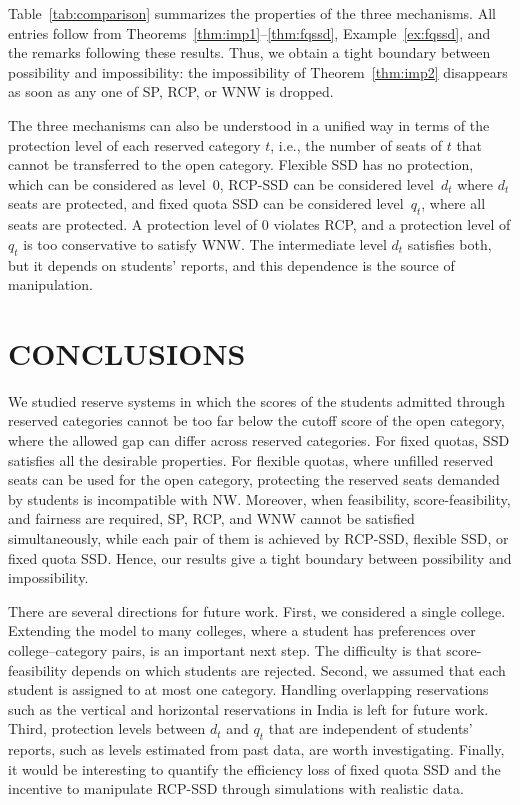 \documentclass[a4paper,twoside]{article}
\theoremstyle{definition}
\begin{document}
Table~\ref{tab:comparison} summarizes the properties of the three mechanisms.
All entries follow from Theorems~\ref{thm:imp1}--\ref{thm:fqssd}, Example~\ref{ex:fqssd}, and the remarks following these results.
Thus, we obtain 
a tight boundary between possibility and
impossibility: the impossibility of Theorem~\ref{thm:imp2} disappears as soon as any one
of SP, RCP, or WNW is dropped.

The three mechanisms can also be understood in a unified way in terms of the protection
level of each reserved category $t$, i.e., the number of seats of $t$ that cannot be transferred to
the open category.
Flexible SSD has no protection, which can be considered as level~$0$, 
RCP-SSD can be considered level~$d_t$ where $d_t$ seats are protected, 
and fixed quota SSD can be considered level~$q_t$, where all seats are protected. 
A protection level of $0$ violates RCP, and a protection level of $q_t$ is too
conservative to satisfy WNW.
The intermediate level $d_t$ satisfies both, but it depends on students' reports,
and this dependence is the source of manipulation.

\section{\uppercase{Conclusions}}
\label{sec:conclusion}

We studied reserve systems in which the scores of the students admitted through reserved
categories cannot be too far below the cutoff score of the open category, where the
allowed gap can differ across reserved categories.
For fixed quotas, SSD satisfies all the desirable
properties.
For flexible quotas, where unfilled reserved seats can be used for the open category,
protecting the reserved seats demanded by students is incompatible with
NW. 
Moreover, when feasibility, score-feasibility, and fairness are required,
SP, RCP, and WNW cannot be
satisfied simultaneously, while each pair of them is achieved by RCP-SSD, flexible SSD,
or fixed quota SSD.
Hence, our results give a tight boundary between possibility and impossibility.

There are several directions for future work.
First, we considered a single college. Extending the model to many colleges, where a
student has preferences over college--category pairs, is an important next step.
The difficulty is that score-feasibility depends on which students are rejected.
Second, we assumed that each student is assigned to at most one category.
Handling overlapping reservations such as the vertical and
horizontal reservations in India \cite{SoYe22a} is left for future work.
Third, protection levels between $d_t$ and $q_t$ that are independent of students'
reports, such as levels estimated from past data, are worth investigating.
Finally, it would be interesting to quantify the efficiency loss of fixed quota SSD and
the incentive to manipulate RCP-SSD through simulations with realistic data.
\end{document}
